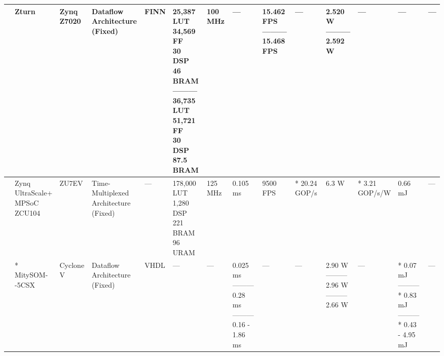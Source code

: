 \begin{center}
{\begin{tabular}{llllllllllllll}
\cite{pitonakCloudSatNet1FPGABasedHardwareAccelerated2022} & Zturn & \makecell[tl]{Zynq\\ Z7020} & \makecell[tl]{Dataflow\\ Architecture\\ (Fixed)} & FINN & \makecell[tl]{25,387 LUT\\ 34,569 FF\\ 30 DSP\\ 46 BRAM\\ ---------\\ 36,735 LUT\\ 51,721 FF\\ 30 DSP\\ 87.5 BRAM} & 100 MHz & --- & \makecell[tl]{15.462 FPS\\ ---------\\ 15.468 FPS} & --- & \makecell[tl]{2.520 W\\ ---------\\ 2.592 W} & --- & --- & --- \\ \hline
\cite{zhangAccurateLowlatencyEfficient2022} & \makecell[tl]{Zynq\\ UltraScale+\\ MPSoC\\ ZCU104} & ZU7EV & \makecell[tl]{Time-Multiplexed\\ Architecture\\ (Fixed)} & --- & \makecell[tl]{178,000 LUT\\ 1,280 DSP\\ 221 BRAM\\ 96 URAM} & 125 MHz & 0.105 ms & 9500 FPS & * 20.24 GOP/s & 6.3 W & \makecell[tl]{* 3.21\\ GOP/s/W} & 0.66 mJ & --- \\ \hline
\cite{abderrahmaneSPLEATSPikingLowpower2022} & \makecell[tl]{* MitySOM-\\-5CSX} & Cyclone V & \makecell[tl]{Dataflow\\ Architecture\\ (Fixed)} & VHDL & --- & --- & \makecell[tl]{0.025 ms\\ ---------\\  0.28 ms\\ ---------\\ 0.16 - 1.86 ms} & --- & --- & \makecell[tl]{2.90 W\\ ---------\\  2.96 W\\ ---------\\ 2.66 W} & --- & \makecell[tl]{* 0.07 mJ\\ ---------\\ * 0.83 mJ\\ ---------\\ * 0.43 - 4.95 mJ} & --- \\ \hline

\end{tabular}}
\end{center}
